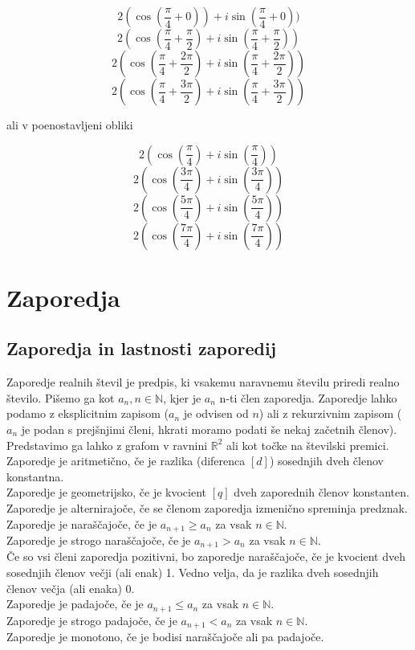 \documentclass[12pt]{report}
\newcommand{\N}{\mathbb{N}}
\newcommand{\R}{\mathbb{R}}
\begin{document}
\[2(\cos(\frac{\pi}{4}+0))+i\sin(\frac{\pi}{4}+0))\]
\[2(\cos(\frac{\pi}{4}+\frac{\pi}{2})+i\sin(\frac{\pi}{4}+\frac{\pi}{2}))\]
\[2(\cos(\frac{\pi}{4}+\frac{2\pi}{2})+i\sin(\frac{\pi}{4}+\frac{2\pi}{2}))\]
\[2(\cos(\frac{\pi}{4}+\frac{3\pi}{2})+i\sin(\frac{\pi}{4}+\frac{3\pi}{2}))\]

ali v poenostavljeni obliki

\[2(\cos(\frac{\pi}{4})+i\sin(\frac{\pi}{4}))\]
\[2(\cos(\frac{3\pi}{4})+i\sin(\frac{3\pi}{4}))\]
\[2(\cos(\frac{5\pi}{4})+i\sin(\frac{5\pi}{4}))\]
\[2(\cos(\frac{7\pi}{4})+i\sin(\frac{7\pi}{4}))\]





\chapter*{Zaporedja}

\section*{Zaporedja in lastnosti zaporedij}
Zaporedje realnih števil je predpis, ki vsakemu naravnemu številu priredi realno število. Pišemo ga kot ${a_n}, n \in \N$, kjer je $a_n$ n-ti člen zaporedja. Zaporedje lahko podamo z eksplicitnim zapisom ($a_n$ je odvisen od $n$) ali z rekurzivnim zapisom ($a_n$ je podan s prejšnjimi členi, hkrati moramo podati še nekaj začetnih členov). Predstavimo ga lahko z grafom v ravnini $\R^2$ ali kot točke na številski premici.\\
\bigbreak
Zaporedje je aritmetično, če je razlika (diferenca $[d]$) sosednjih dveh členov konstantna.\\
\bigbreak
Zaporedje je geometrijsko, če je kvocient $[q]$ dveh zaporednih členov konstanten.\\
\bigbreak
Zaporedje je alternirajoče, če se členom zaporedja izmenično spreminja predznak.\\
\bigbreak
Zaporedje je naraščajoče, če je $a_{n+1} \geq a_n$ za vsak $n\in \N$.\\ 
Zaporedje je strogo naraščajoče, če je $a_{n+1} > a_n$ za vsak $n\in \N$. \\
Če so vsi členi zaporedja pozitivni, bo zaporedje naraščajoče, če je kvocient dveh sosednjih členov večji (ali enak) 1. Vedno velja, da je razlika dveh sosednjih členov večja (ali enaka) 0.\\
\bigbreak
Zaporedje je padajoče, če je $a_{n+1} \leq a_n$ za vsak $n\in \N$.\\
Zaporedje je strogo padajoče, če je $a_{n+1} < a_n$ za vsak $n\in \N$.\\
\bigbreak
Zaporedje je monotono, če je bodisi naraščajoče ali pa padajoče.
\end{document}

